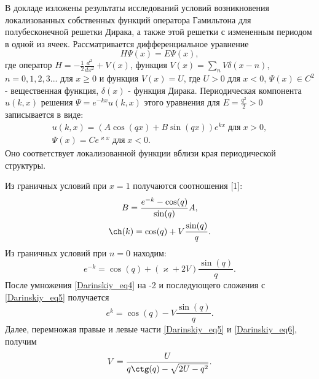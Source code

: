 \vzmscaption

В докладе изложены результаты исследований условий возникновения локализованных собственных функций оператора Гамильтона
для полубесконечной решетки Дирака, а также этой решетки с измененным периодом в одной из ячеек. Рассматривается дифференциальное уравнение
\begin{equation} \label{Darinskiy_eq1}
 H\Psi(x)=E\Psi(x),
\end{equation}
где оператор $H=-\frac{1}{2}\frac{d^2}{dx^2}+V(x)$, функция $V(x)=\sum\limits_nV\delta(x-n)$, $n=0,1,2,3...$ для $x\geq0$ и
функция $V(x)=U$, где $U>0$ для $x<0$, $\Psi(x)\in C^2$ - вещественная функция,
$\delta(x)$ - функция Дирака. Периодическая компонента $u(k,x)$ решения $\Psi=e^{-kx}u(k,x)$ этого уравнения  для $E=\frac{q^2}{2}>0$ записывается в виде:
\begin{equation} \label{Darinskiy_eq2}
\begin{array}{c}
u(k,x)=(A\cos(qx)+B\sin(qx))e^{kx}\;\text{для}\;x>0,\\
\Psi(x)=Ce^{\varkappa x}\;\text{для}\;x<0.
\end{array}
\end{equation}
Оно соответствует локализованной функции вблизи края периодической структуры.
\par Из граничных условий при $x=1$ получаются соотношения [1]:
\begin{gather}
B=\frac{e^{-k}-\cos(q)}{\sin(q)}A,\\
\ch(k)=\cos(q)+V\frac{\sin(q)}{q}. \label{Darinskiy_eq4}
\end{gather}
Из граничных условий при $n=0$ находим:
\begin{equation}\label{Darinskiy_eq5}
e^{-k}=\cos(q)+\left(\varkappa+2V\right)\frac{\sin(q)}{q}.
\end{equation}
После умножения \eqref{Darinskiy_eq4} на -2 и последующего сложения с \eqref{Darinskiy_eq5} получается
\begin{equation} \label{Darinskiy_eq6}
 e^{k}=\cos(q)-V\frac{\sin(q)}{q}.
\end{equation}
Далее, перемножая правые и левые части \eqref{Darinskiy_eq5} и \eqref{Darinskiy_eq6}, получим
\begin{equation} \label{Darinskiy_eq7}
V=\frac{U}{q\ctg(q)-\sqrt{2U-q^2}}.
\end{equation}
